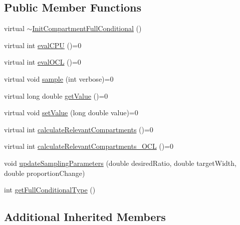 \subsection*{Public Member Functions}
\begin{DoxyCompactItemize}
\item 
virtual \hyperlink{classSpatialSEIR_1_1InitCompartmentFullConditional_a4d1e4214653686f98dbe94809e6a8390}{$\sim$\-Init\-Compartment\-Full\-Conditional} ()
\item 
virtual int \hyperlink{classSpatialSEIR_1_1InitCompartmentFullConditional_a25fc6e3ac2cb71a6e115ce3235fd8de0}{eval\-C\-P\-U} ()=0
\item 
virtual int \hyperlink{classSpatialSEIR_1_1InitCompartmentFullConditional_a2f0c4b5628e2f2074c1a84ea6349a754}{eval\-O\-C\-L} ()=0
\item 
virtual void \hyperlink{classSpatialSEIR_1_1InitCompartmentFullConditional_a03bcc440fa87265336980f3e833f59f2}{sample} (int verbose)=0
\item 
virtual long double \hyperlink{classSpatialSEIR_1_1InitCompartmentFullConditional_aadb3975a791221136e6c4be5e016d9f1}{get\-Value} ()=0
\item 
virtual void \hyperlink{classSpatialSEIR_1_1InitCompartmentFullConditional_acbc03a68f5c67beacefadcc3c22c1d88}{set\-Value} (long double value)=0
\item 
virtual int \hyperlink{classSpatialSEIR_1_1InitCompartmentFullConditional_a3fab33c4f5b857998fd928a00cea09e7}{calculate\-Relevant\-Compartments} ()=0
\item 
virtual int \hyperlink{classSpatialSEIR_1_1InitCompartmentFullConditional_aa4eae1aafbcdc4819be2e520d600dedf}{calculate\-Relevant\-Compartments\-\_\-\-O\-C\-L} ()=0
\item 
void \hyperlink{classSpatialSEIR_1_1InitCompartmentFullConditional_a7cf7ddd043ec51b17a3c369ebe03a95c}{update\-Sampling\-Parameters} (double desired\-Ratio, double target\-Width, double proportion\-Change)
\item 
int \hyperlink{classSpatialSEIR_1_1InitCompartmentFullConditional_a6c35c9ed95a8adbada0e3da0608531bd}{get\-Full\-Conditional\-Type} ()
\end{DoxyCompactItemize}
\subsection*{Additional Inherited Members}


